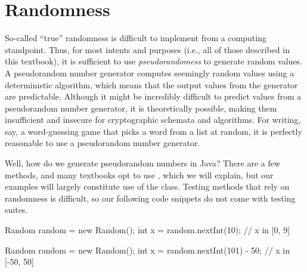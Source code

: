 \section{Randomness}
So-called ``true'' randomness is difficult to implement from a computing standpoint. Thus, for most intents and purposes (i.e., all of those described in this textbook), it is sufficient to use \textit{pseudorandomess} to generate random values. A pseudorandom number generator computes seemingly random values using a deterministic algorithm, which means that the output values from the generator are predictable. Although it might be incredibly difficult to predict values from a pseudorandom number generator, it is theoretically possible, making them insufficient and insecure for cryptographic schemata and algorithms. For writing, say, a word-guessing game that picks a word from a list at random, it is perfectly reasonable to use a pseudorandom number generator.

Well, how do we generate pseudorandom numbers in Java? There are a few methods, and many textbooks opt to use , which we will explain, but our examples will largely constitute use of the  class. Testing methods that rely on randomness is difficult, so our following code snippets do not come with testing suites. 


\begin{verbnobox}[\small]
Random random = new Random();
int x = random.nextInt(10); // x in [0, 9]
\end{verbnobox}

\begin{verbnobox}[\small]
Random random = new Random();
int x = random.nextInt(101) - 50; // x in [-50, 50]
\end{verbnobox}


